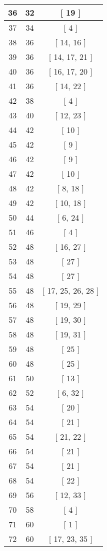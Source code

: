 \begin{center}
\begin{longtable}[H]{|| c c c ||}
\hline
36 & 32 & [ 19 ] \\ 
\hline
37 & 34 & [ 4 ] \\ 
\hline
38 & 36 & [ 14, 16 ] \\ 
\hline
39 & 36 & [ 14, 17, 21 ] \\ 
\hline
40 & 36 & [ 16, 17, 20 ] \\ 
\hline
41 & 36 & [ 14, 22 ] \\ 
\hline
42 & 38 & [ 4 ] \\ 
\hline
43 & 40 & [ 12, 23 ] \\ 
\hline
44 & 42 & [ 10 ] \\ 
\hline
45 & 42 & [ 9 ] \\ 
\hline
46 & 42 & [ 9 ] \\ 
\hline
47 & 42 & [ 10 ] \\ 
\hline
48 & 42 & [ 8, 18 ] \\ 
\hline
49 & 42 & [ 10, 18 ] \\ 
\hline
50 & 44 & [ 6, 24 ] \\ 
\hline
51 & 46 & [ 4 ] \\ 
\hline
52 & 48 & [ 16, 27 ] \\ 
\hline
53 & 48 & [ 27 ] \\ 
\hline
54 & 48 & [ 27 ] \\ 
\hline
55 & 48 & [ 17, 25, 26, 28 ] \\ 
\hline
56 & 48 & [ 19, 29 ] \\ 
\hline
57 & 48 & [ 19, 30 ] \\ 
\hline
58 & 48 & [ 19, 31 ] \\ 
\hline
59 & 48 & [ 25 ] \\ 
\hline
60 & 48 & [ 25 ] \\ 
\hline
61 & 50 & [ 13 ] \\ 
\hline
62 & 52 & [ 6, 32 ] \\ 
\hline
63 & 54 & [ 20 ] \\ 
\hline
64 & 54 & [ 21 ] \\ 
\hline
65 & 54 & [ 21, 22 ] \\ 
\hline
66 & 54 & [ 21 ] \\ 
\hline
67 & 54 & [ 21 ] \\ 
\hline
68 & 54 & [ 22 ] \\ 
\hline
69 & 56 & [ 12, 33 ] \\ 
\hline
70 & 58 & [ 4 ] \\ 
\hline
71 & 60 & [ 1 ] \\ 
\hline
72 & 60 & [ 17, 23, 35 ] \\ 
\hline

\end{longtable}
\end{center}
